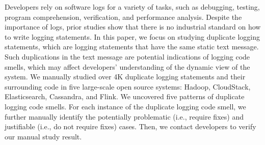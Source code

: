Developers rely on software logs for a variety of tasks, such as debugging, testing, program comprehension, verification, and performance analysis. Despite the importance of logs, prior studies show that there is no industrial standard on how to write logging statements. %
In this paper, we focus on studying duplicate logging statements, which are logging statements that have the same static text message. Such duplications in the text message are potential indications of logging code smells, which may affect developers' understanding of the dynamic view of the system. We manually studied over 4K duplicate logging statements and their surrounding code in five large-scale open source systems: Hadoop, CloudStack, Elasticsearch, Cassandra, and Flink. We uncovered five patterns of duplicate logging code smells. For each instance of the duplicate logging code smell, we further manually identify the potentially problematic (i.e., require fixes) and justifiable (i.e., do not require fixes) cases. Then, we contact developers to verify our manual study result. %
